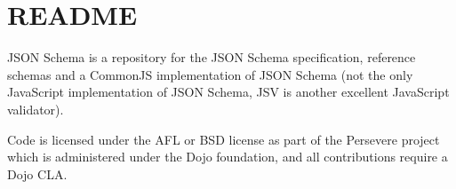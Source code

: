 \chapter{README}
\hypertarget{md__c_1_2_users_2_s_t_r_i_d_e_r_2source_2repos_2_internal_a_p_i_2_internal_a_p_i_2wwwroot_2lib_27c4709519cdd9694fc154139172afcf1}{}\label{md__c_1_2_users_2_s_t_r_i_d_e_r_2source_2repos_2_internal_a_p_i_2_internal_a_p_i_2wwwroot_2lib_27c4709519cdd9694fc154139172afcf1}
JSON Schema is a repository for the JSON Schema specification, reference schemas and a Common\+JS implementation of JSON Schema (not the only Java\+Script implementation of JSON Schema, JSV is another excellent Java\+Script validator).

Code is licensed under the AFL or BSD license as part of the Persevere project which is administered under the Dojo foundation, and all contributions require a Dojo CLA. 